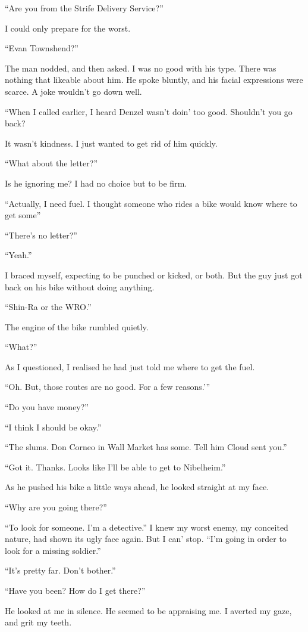 \documentclass[oneside]{book}
\begin{document}
“Are you from the Strife Delivery Service?”

I could only prepare for the worst.

“Evan Townshend?”

The man nodded, and then asked. I was no good with his type. There was nothing that likeable about him. He spoke bluntly, and his facial expressions were scarce. A joke wouldn’t go down well.

“When I called earlier, I heard Denzel wasn’t doin’ too good. Shouldn’t you go back?

It wasn’t kindness. I just wanted to get rid of him quickly.

“What about the letter?”

Is he ignoring me? I had no choice but to be firm.

“Actually, I need fuel. I thought someone who rides a bike would know where to get some”

“There’s no letter?”

“Yeah.”

I braced myself, expecting to be punched or kicked, or both. But the guy just got back on his bike without doing anything.

“Shin-Ra or the WRO.”

The engine of the bike rumbled quietly.

“What?”

As I questioned, I realised he had just told me where to get the fuel.

“Oh. But, those routes are no good. For a few reasons.’”

“Do you have money?”

“I think I should be okay.”

“The slums. Don Corneo in Wall Market has some. Tell him Cloud sent you.”

“Got it. Thanks. Looks like I’ll be able to get to Nibelheim.”

As he pushed his bike a little ways ahead, he looked straight at my face.

“Why are you going there?”

“To look for someone. I’m a detective.” I knew my worst enemy, my conceited nature, had shown its ugly face again. But I can’ stop. “I’m going in order to look for a missing soldier.”

“It’s pretty far. Don’t bother.”

“Have you been? How do I get there?”

He looked at me in silence. He seemed to be appraising me. I averted my gaze, and grit my teeth.
\end{document}
